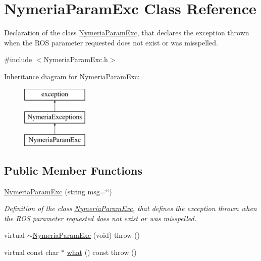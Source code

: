 \hypertarget{class_nymeria_param_exc}{}\section{Nymeria\+Param\+Exc Class Reference}
\label{class_nymeria_param_exc}


Declaration of the class \hyperlink{class_nymeria_param_exc}{Nymeria\+Param\+Exc}, that declares the exception thrown when the R\+O\+S parameter requested does not exist or was misspelled.  




{\ttfamily \#include $<$Nymeria\+Param\+Exc.\+h$>$}

Inheritance diagram for Nymeria\+Param\+Exc\+:\begin{figure}[H]
\begin{center}
\leavevmode
\includegraphics[height=3.000000cm]{class_nymeria_param_exc}
\end{center}
\end{figure}
\subsection*{Public Member Functions}
\begin{DoxyCompactItemize}
\item 
\hyperlink{class_nymeria_param_exc_a253c3cfe3e927036a1043836394cb6fe}{Nymeria\+Param\+Exc} (string msg=\char`\"{}\char`\"{})
\begin{DoxyCompactList}\small\item\em Definition of the class \hyperlink{class_nymeria_param_exc}{Nymeria\+Param\+Exc}, that defines the exception thrown when the R\+O\+S parameter requested does not exist or was misspelled. \end{DoxyCompactList}\item 
virtual \hyperlink{class_nymeria_param_exc_af6d407354b2432ef7a9e0c504802f955}{$\sim$\+Nymeria\+Param\+Exc} (void)  throw ()
\item 
virtual const char $\ast$ \hyperlink{class_nymeria_param_exc_ae286e24a03c91eeb062a50f4e090b757}{what} () const   throw ()
\end{DoxyCompactItemize}


